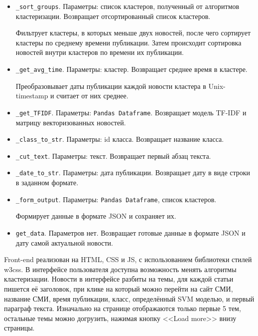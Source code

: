 \begin{itemize}
    \item \verb|_sort_groups|. Параметры: список кластеров, полученный от
    алгоритмов кластеризации. Возвращает отсортированный список кластеров.

    Фильтрует кластеры, в которых меньше двух новостей, после чего сортирует кластеры по среднему времени публикации.
    Затем происходит сортировка новостей внутри кластеров по времени их публикации.

    \item \verb|_get_avg_time|. Параметры: кластер. Возвращает среднее время
    в кластере.

    Преобразовывает даты публикации каждой новости кластера в Unix-timestamp и
    считает от них среднее.

    \item \verb|_get_TFIDF|. Параметры: \verb|Pandas Dataframe|.
    Возвращает модель TF-IDF и матрицу векторизованных новостей.

    \item \verb|_class_to_str|. Параметры: id класса.
    Возвращает название класса.

    \item \verb|_cut_text|. Параметры: текст.
    Возвращает первый абзац текста.

    \item \verb|_date_to_str|. Параметры: дата публикации.
    Возвращает дату в виде строки в заданном формате.

    \item \verb|_form_output|. Параметры: \verb|Pandas Dataframe|, список
    кластеров.

    Формирует данные в формате JSON и сохраняет их.

    \item \verb|get_data|. Параметров нет.
    Возвращает готовые данные в формате JSON и дату самой актуальной новости.
\end{itemize}

Front-end реализован на HTML, CSS и JS, с использованием библиотеки стилей w3css. 
В интерфейсе пользователя доступна возможность менять алгоритмы кластеризации. Новости в интерфейсе
разбиты на темы, для каждой статьи пишется её заголовок, при клике на который можно
перейти на сайт СМИ, название СМИ, время публикации, класс, определённый SVM моделью,
и первый параграф текста. Изначально на странице отображаются только первые 5 тем,
остальные темы можно догрузить, нажимая кнопку <<Load more>> внизу страницы.
